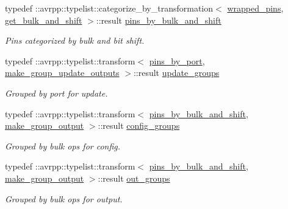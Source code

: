 \begin{DoxyCompactItemize}
typedef ::avrpp::typelist::categorize\_\-by\_\-transformation$<$ \hyperlink{structavrpp_1_1bus_1_1output__bus_a80cbab4a94f1c05bf8e0f133a59a7fbb}{wrapped\_\-pins}, \hyperlink{structavrpp_1_1bus_1_1get__bulk__and__shift}{get\_\-bulk\_\-and\_\-shift} $>$::result \hyperlink{structavrpp_1_1bus_1_1output__bus_ae47617c6facd6a8a4a60a526676074e8}{pins\_\-by\_\-bulk\_\-and\_\-shift}
\begin{DoxyCompactList}\small\item\em Pins categorized by bulk and bit shift. \item\end{DoxyCompactList}\item 
typedef ::avrpp::typelist::transform$<$ \hyperlink{structavrpp_1_1bus_1_1output__bus_a799be6ff173156ae47c7f4e8725f790f}{pins\_\-by\_\-port}, \hyperlink{structavrpp_1_1bus_1_1output__bus_1_1make__group__update__outputs}{make\_\-group\_\-update\_\-outputs} $>$::result \hyperlink{structavrpp_1_1bus_1_1output__bus_a11b639509831093295a592576d5fe85a}{update\_\-groups}
\begin{DoxyCompactList}\small\item\em Grouped by port for update. \item\end{DoxyCompactList}\item 
typedef ::avrpp::typelist::transform$<$ \hyperlink{structavrpp_1_1bus_1_1output__bus_ae47617c6facd6a8a4a60a526676074e8}{pins\_\-by\_\-bulk\_\-and\_\-shift}, \hyperlink{structavrpp_1_1bus_1_1output__bus_1_1make__group__output}{make\_\-group\_\-output} $>$::result \hyperlink{structavrpp_1_1bus_1_1output__bus_a36107557891fe8e1d7d6820be3f41f30}{config\_\-groups}
\begin{DoxyCompactList}\small\item\em Grouped by bulk ops for config. \item\end{DoxyCompactList}\item 
typedef ::avrpp::typelist::transform$<$ \hyperlink{structavrpp_1_1bus_1_1output__bus_ae47617c6facd6a8a4a60a526676074e8}{pins\_\-by\_\-bulk\_\-and\_\-shift}, \hyperlink{structavrpp_1_1bus_1_1output__bus_1_1make__group__output}{make\_\-group\_\-output} $>$::result \hyperlink{structavrpp_1_1bus_1_1output__bus_adcc13b4cd461b37b69491bf1ce2abeca}{out\_\-groups}
\begin{DoxyCompactList}\small\item\em Grouped by bulk ops for output. \item\end{DoxyCompactList}\item 

\end{DoxyCompactItemize}
